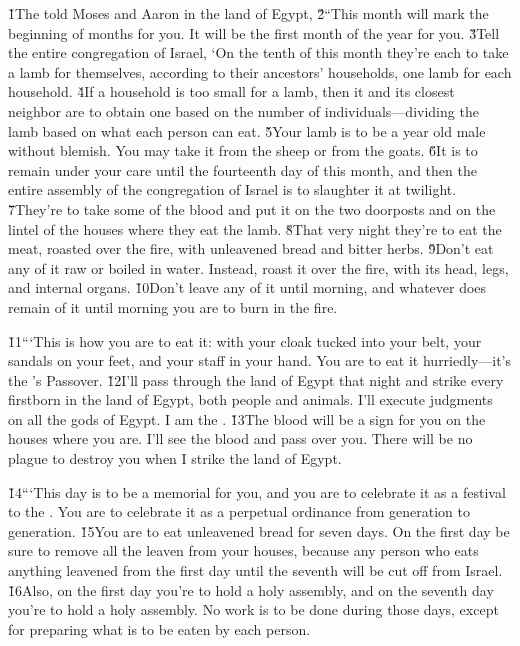 \v{1}The  told Moses and Aaron in the land of Egypt, \v{2}``This month will mark the beginning of months for you. It will be the first month of the year for you. \v{3}Tell the entire congregation of Israel, `On the tenth of this month they're each to take a lamb for themselves, according to their ancestors' households, one lamb for each household. \v{4}If a household is too small for a lamb, then it and its closest neighbor are to obtain one based on the number of individuals---dividing the lamb based on what each person can eat. \v{5}Your lamb is to be a year old male without blemish. You may take it from the sheep or from the goats. \v{6}It is to remain under your care until the fourteenth day of this month, and then the entire assembly of the congregation of Israel is to slaughter it at twilight. \v{7}They're to take some of the blood and put it on the two doorposts and on the lintel of the houses where they eat the lamb. \v{8}That very night they're to eat the meat, roasted over the fire, with unleavened bread and bitter herbs. \v{9}Don't eat any of it raw or boiled in water. Instead, roast it over the fire, with its head, legs, and internal organs. \v{10}Don't leave any of it until morning, and whatever does remain of it until morning you are to burn in the fire.

\v{11}```This is how you are to eat it: with your cloak tucked into your belt, your sandals on your feet, and your staff in your hand. You are to eat it hurriedly---it's the 's Passover. \v{12}I'll pass through the land of Egypt that night and strike every firstborn in the land of Egypt, both people and animals. I'll execute judgments on all the gods of Egypt. I am the . \v{13}The blood will be a sign for you on the houses where you are. I'll see the blood and pass over you. There will be no plague to destroy you when I strike the land of Egypt.

\v{14}```This day is to be a memorial for you, and you are to celebrate it as a festival to the . You are to celebrate it as a perpetual ordinance from generation to generation. \v{15}You are to eat unleavened bread for seven days. On the first day be sure to remove all the leaven from your houses, because any person who eats anything leavened from the first day until the seventh will be cut off from Israel. \v{16}Also, on the first day you're to hold a holy assembly, and on the seventh day you're to hold a holy assembly. No work is to be done during those days, except for preparing what is to be eaten by each person.

